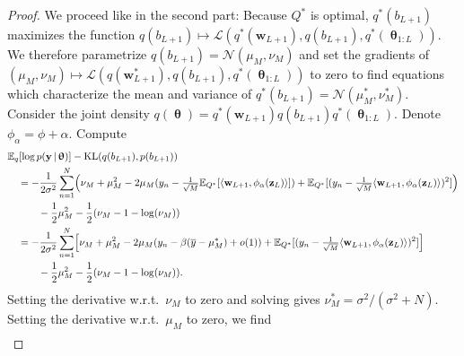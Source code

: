 \documentclass[twoside]{article}
\newcommand{\vw}{\mathbf{w}}
\newcommand{\vy}{\mathbf{y}}
\newcommand{\vz}{\mathbf{z}}
\newcommand{\vmu}{\bm{\upmu}}
\newcommand{\vnu}{\bm{\upnu}}
\newcommand{\vtheta}{\bm{\uptheta}}
\newcommand{\E}{\mathbb{E}}
\renewcommand{\L}{\mathcal{L}}
\newcommand{\T}{\text{\textsf{T}}}
\newcommand{\opspace}{}
\newcommand{\diag}{\operatorname{diag}\opspace}
\newcommand{\KL}{\operatorname{KL}}
\newcommand{\Normal}{\mathcal{N}}
\newcommand{\cond}{\,|\,}                  %
\DeclarePairedDelimiter\parens{(}{)}             %
\DeclarePairedDelimiter\sbrac{[}{]}              %
\DeclarePairedDelimiter\lra{\langle}{\rangle}    %
\theoremstyle{theoremstyle}
\begin{document}
\begin{proof}
    We proceed like in the second part:
    Because $Q^*$ is optimal, $q^*(b_{L+1})$ maximizes the function $q(b_{L+1}) \mapsto \L(q^*(\vw_{L+1}),q(b_{L+1}),q^*(\vtheta_{1:L}))$.
    We therefore parametrize $q(b_{L+1}) = \Normal(\mu_M, \nu_M)$ and set the gradients of $(\mu_M, \nu_M) \mapsto \L(q(\vw^*_{L+1}),q(b_{L+1}),q^*(\vtheta_{1:L}))$ to zero to find equations which characterize the mean and variance of $q^*(b_{L+1}) = \Normal(\mu_M^*, \nu_M^*)$.
    Consider the joint density $q(\vtheta) = q^*(\vw_{L+1})q(b_{L+1})q^*(\vtheta_{1:L})$.
    Denote $\phi_\alpha = \phi + \alpha$.
    Compute
    \begin{align}
        &\E_q[\log p(\vy \cond \vtheta)]
        - \KL(q(b_{L+1}),p(b_{L+1})) \nonumber \\
        &\quad
        = -\frac1{2\sigma^2}\sum_{n=1}^N
        \parens*{
            \nu_M + \mu_M^2
            - 2 \mu_M (
                y_n
                - \tfrac{1}{\sqrt{M}}\E_{Q^*}[\lra{
                    \vw_{L+1},
                    \phi_\alpha(\vz_L)
                }]
            )
            + \E_{Q^*}[(
                y_n
                - \tfrac{1}{\sqrt{M}}\lra{
                    \vw_{L+1},
                    \phi_\alpha(\vz_L)
                }
            )^2]
        } \nonumber\\
        &\quad\qquad - \frac12\mu_M^2 - \frac12(\nu_M - 1 - \log(\nu_M)) \\
        &\quad
        = -\frac1{2\sigma^2}\sum_{n=1}^N
        \sbrac*{
            \nu_M + \mu_M^2
            - 2 \mu_M (
                y_n
                - \beta ( \overline{y} - \mu^*_M) + o(1)
            )
            + \E_{Q^*}[(
                y_n
                - \tfrac{1}{\sqrt{M}}\lra{
                    \vw_{L+1},
                    \phi_\alpha(\vz_L)
                }
            )^2]
        } \nonumber\\
        &\quad\qquad - \frac12\mu_M^2 - \frac12(\nu_M - 1 - \log(\nu_M)).
    \end{align}
    Setting the derivative w.r.t.\ $\nu_M$ to zero and solving gives $\nu_M^* = \sigma^2/(\sigma^2 + N)$.
    Setting the derivative w.r.t.\ $\mu_M$ to zero, we find
    \begin{align}

\end{align}
\end{proof}
\end{document}
